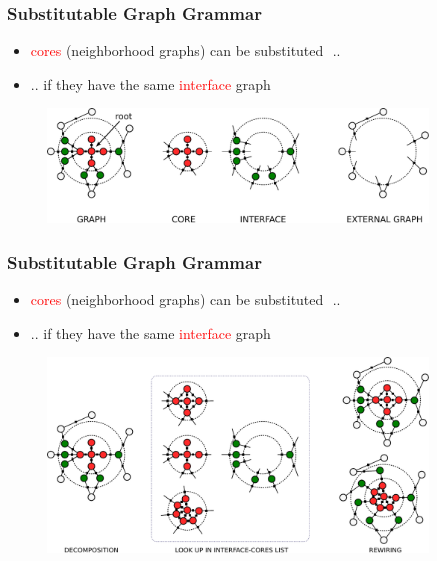 \documentclass{beamer}
\newcommand{\red}[1]{\textcolor{red}{#1}}
\begin{document}
\begin{frame}
    \frametitle{Substitutable Graph Grammar}
    \begin{itemize}
        \item \red{cores} (neighborhood graphs) can be substituted  ..
        \item .. if they have the same \red{interface} graph
    \end{itemize}
    \begin{figure}[ht]
        \centering
        \includegraphics[width=0.9\textwidth]{images/cip1.pdf}
    \end{figure}
\end{frame}

\begin{frame}
    \frametitle{Substitutable Graph Grammar}
    \begin{itemize}
        \item \red{cores} (neighborhood graphs) can be substituted  ..
        \item .. if they have the same \red{interface} graph
    \end{itemize}
    \begin{figure}[ht]
        \centering
        \includegraphics[width=0.9\textwidth]{images/cip2.pdf}
    \end{figure}
\end{frame}
\end{document}
